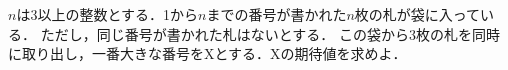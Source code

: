 \documentclass[../../main.tex]{subfiles}
\begin{document}
$n$は3以上の整数とする．1から$n$までの番号が書かれた$n$枚の札が袋に入っている．
ただし，同じ番号が書かれた札はないとする．
この袋から3枚の札を同時に取り出し，一番大きな番号をXとする．Xの期待値を求めよ．
\end{document}
